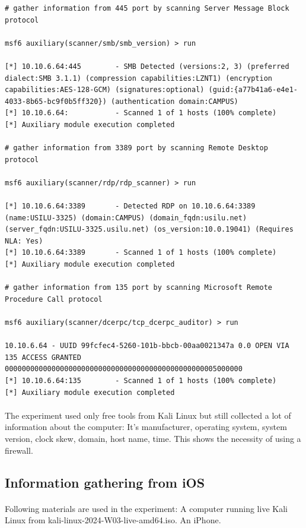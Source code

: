 \documentclass[mscthesis]{usiinfthesis}
\begin{document}
\begin{lstlisting}[language={},frame=single,breaklines=true,postbreak=\mbox{\textcolor{red}{$\hookrightarrow$}\space}]
# gather information from 445 port by scanning Server Message Block protocol

msf6 auxiliary(scanner/smb/smb_version) > run

[*] 10.10.6.64:445        - SMB Detected (versions:2, 3) (preferred dialect:SMB 3.1.1) (compression capabilities:LZNT1) (encryption capabilities:AES-128-GCM) (signatures:optional) (guid:{a77b41a6-e4e1-4033-8b65-bc9f0b5ff320}) (authentication domain:CAMPUS)
[*] 10.10.6.64:           - Scanned 1 of 1 hosts (100% complete)
[*] Auxiliary module execution completed

# gather information from 3389 port by scanning Remote Desktop protocol

msf6 auxiliary(scanner/rdp/rdp_scanner) > run

[*] 10.10.6.64:3389       - Detected RDP on 10.10.6.64:3389       (name:USILU-3325) (domain:CAMPUS) (domain_fqdn:usilu.net) (server_fqdn:USILU-3325.usilu.net) (os_version:10.0.19041) (Requires NLA: Yes)
[*] 10.10.6.64:3389       - Scanned 1 of 1 hosts (100% complete)
[*] Auxiliary module execution completed

# gather information from 135 port by scanning Microsoft Remote Procedure Call protocol

msf6 auxiliary(scanner/dcerpc/tcp_dcerpc_auditor) > run

10.10.6.64 - UUID 99fcfec4-5260-101b-bbcb-00aa0021347a 0.0 OPEN VIA 135 ACCESS GRANTED 00000000000000000000000000000000000000000000000005000000
[*] 10.10.6.64:135        - Scanned 1 of 1 hosts (100% complete)
[*] Auxiliary module execution completed
\end{lstlisting}
\paragraph{}
The experiment used only free tools from Kali Linux but still collected a lot of information about the computer: It's manufacturer, operating system, system version, clock skew, domain, host name, time. This shows the necessity of using a firewall.

\subsection{Information gathering from iOS}
\paragraph{}
Following materials are used in the experiment: A computer running live Kali Linux from kali-linux-2024-W03-live-amd64.iso. An iPhone.
\end{document}
